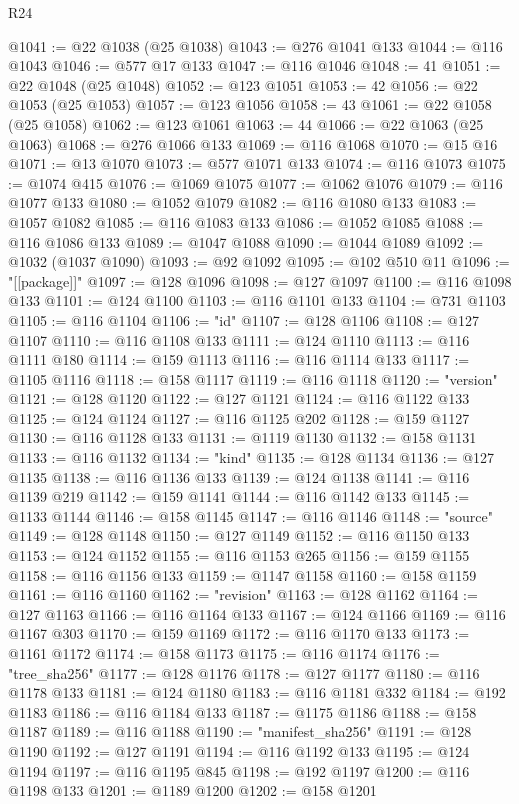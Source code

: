 \begin{lexlean}{R24}
\begin{coremodule}
@1041 := @22 @1038 (@25 @1038)
@1043 := @276 @1041 @133
@1044 := @116 @1043
@1046 := @577 @17 @133
@1047 := @116 @1046
@1048 := 41
@1051 := @22 @1048 (@25 @1048)
@1052 := @123 @1051
@1053 := 42
@1056 := @22 @1053 (@25 @1053)
@1057 := @123 @1056
@1058 := 43
@1061 := @22 @1058 (@25 @1058)
@1062 := @123 @1061
@1063 := 44
@1066 := @22 @1063 (@25 @1063)
@1068 := @276 @1066 @133
@1069 := @116 @1068
@1070 := @15 @16
@1071 := @13 @1070
@1073 := @577 @1071 @133
@1074 := @116 @1073
@1075 := @1074 @415
@1076 := @1069 @1075
@1077 := @1062 @1076
@1079 := @116 @1077 @133
@1080 := @1052 @1079
@1082 := @116 @1080 @133
@1083 := @1057 @1082
@1085 := @116 @1083 @133
@1086 := @1052 @1085
@1088 := @116 @1086 @133
@1089 := @1047 @1088
@1090 := @1044 @1089
@1092 := @1032 (@1037 @1090)
@1093 := @92 @1092
@1095 := @102 @510 @11
@1096 := "[[package]]"
@1097 := @128 @1096
@1098 := @127 @1097
@1100 := @116 @1098 @133
@1101 := @124 @1100
@1103 := @116 @1101 @133
@1104 := @731 @1103
@1105 := @116 @1104
@1106 := "id"
@1107 := @128 @1106
@1108 := @127 @1107
@1110 := @116 @1108 @133
@1111 := @124 @1110
@1113 := @116 @1111 @180
@1114 := @159 @1113
@1116 := @116 @1114 @133
@1117 := @1105 @1116
@1118 := @158 @1117
@1119 := @116 @1118
@1120 := "version"
@1121 := @128 @1120
@1122 := @127 @1121
@1124 := @116 @1122 @133
@1125 := @124 @1124
@1127 := @116 @1125 @202
@1128 := @159 @1127
@1130 := @116 @1128 @133
@1131 := @1119 @1130
@1132 := @158 @1131
@1133 := @116 @1132
@1134 := "kind"
@1135 := @128 @1134
@1136 := @127 @1135
@1138 := @116 @1136 @133
@1139 := @124 @1138
@1141 := @116 @1139 @219
@1142 := @159 @1141
@1144 := @116 @1142 @133
@1145 := @1133 @1144
@1146 := @158 @1145
@1147 := @116 @1146
@1148 := "source"
@1149 := @128 @1148
@1150 := @127 @1149
@1152 := @116 @1150 @133
@1153 := @124 @1152
@1155 := @116 @1153 @265
@1156 := @159 @1155
@1158 := @116 @1156 @133
@1159 := @1147 @1158
@1160 := @158 @1159
@1161 := @116 @1160
@1162 := "revision"
@1163 := @128 @1162
@1164 := @127 @1163
@1166 := @116 @1164 @133
@1167 := @124 @1166
@1169 := @116 @1167 @303
@1170 := @159 @1169
@1172 := @116 @1170 @133
@1173 := @1161 @1172
@1174 := @158 @1173
@1175 := @116 @1174
@1176 := "tree_sha256"
@1177 := @128 @1176
@1178 := @127 @1177
@1180 := @116 @1178 @133
@1181 := @124 @1180
@1183 := @116 @1181 @332
@1184 := @192 @1183
@1186 := @116 @1184 @133
@1187 := @1175 @1186
@1188 := @158 @1187
@1189 := @116 @1188
@1190 := "manifest_sha256"
@1191 := @128 @1190
@1192 := @127 @1191
@1194 := @116 @1192 @133
@1195 := @124 @1194
@1197 := @116 @1195 @845
@1198 := @192 @1197
@1200 := @116 @1198 @133
@1201 := @1189 @1200
@1202 := @158 @1201

\end{coremodule}
\end{lexlean}
